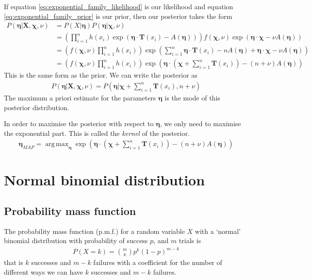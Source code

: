 \documentclass[a4paper,12pt]{article}
\theoremstyle{definition}
\DeclareMathOperator*{\argmax}{arg\,max} %
\begin{document}
If equation \ref{eq:exponential_family_likelihood} is our likelihood and equation \ref{eq:exponential_family_prior} is our prior, then our posterior takes the form
\begin{align}
  P(\boldsymbol{\eta} | \mathbf{X}, \boldsymbol{\chi}, \nu) & = P(X | \boldsymbol{\eta}) P(\boldsymbol{\eta} | \boldsymbol{\chi}, \nu) \\
  & = \left( \prod_{i=1}^n h(x_i) \exp \left( \boldsymbol{\eta}\cdot \mathbf{T}(x_i) - A(\boldsymbol{\eta}) \right) \right) f(\boldsymbol{\chi}, \nu)\exp (\boldsymbol{\eta} \cdot \boldsymbol{\chi} - \nu A(\boldsymbol{\eta})) \\ 
  & = \left( f(\boldsymbol{\chi}, \nu) \prod_{i=1}^n h(x_i) \right) \exp \left( \sum_{i=1}^n \boldsymbol{\eta} \cdot \mathbf{T}(x_i) - nA(\boldsymbol{\eta}) + \boldsymbol{\eta} \cdot \boldsymbol{\chi} - \nu A(\boldsymbol{\eta}) \right) \\
  & = \left( f(\boldsymbol{\chi}, \nu) \prod_{i=1}^n h(x_i) \right) \exp \left( \boldsymbol{\eta} \cdot \left(\boldsymbol{\chi} + \sum_{i=1}^n\mathbf{T}(x_i) \right) - (n + \nu) A(\boldsymbol{\eta}) \right)
\end{align}
This is the same form as the prior. We can write the posterior as 
\begin{align}
  P(\boldsymbol{\eta} | \mathbf{X}, \boldsymbol{\chi}, \nu) = P (\boldsymbol{\eta} | \boldsymbol{\chi} + \sum_{i=1}^n\mathbf{T}(x_i) , n + \nu )
\end{align}
The maximum a priori estimate for the parameters $\boldsymbol{\eta}$ is the mode of this posterior distribution.

In order to maximise the posterior with respect to $\boldsymbol{\eta}$, we only need to maximise the exponential part. This is called the \textit{kernel} of the posterior.
\begin{align}
  \boldsymbol{\eta}_{MAP} = \argmax_{\boldsymbol{\eta}} \exp \left( \boldsymbol{\eta} \cdot \left(\boldsymbol{\chi} + \sum_{i=1}^n\mathbf{T}(x_i) \right) - (n + \nu) A(\boldsymbol{\eta}) \right)
\end{align}

\section{Normal binomial distribution}\label{normal}
\subsection{Probability mass function}
The probability mass function (p.m.f.) for a random variable $X$ with a `normal' binomial distribution with probability of success $p$, and $m$ trials is
\begin{align}
  P(X=k) = \binom{m}{k} p^k (1-p)^{m-k}
\end{align}
that is $k$ successes and $m-k$ failures with a coefficient for the number of different ways we can have $k$ successes and $m-k$ failures. 
\end{document}
